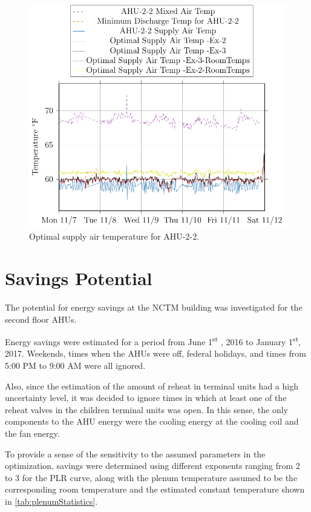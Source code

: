 \begin{figure}
\centering
\includegraphics[]{Plots/2016-11-16-1636-AHU22MixedAirTemp-TikzData.pdf}
\caption{Optimal supply air temperature for AHU-2-2.}
\label{fig:2016-11-16-1636-AHU22MixedAirTemp-TikzData}
\end{figure}

\section{Savings Potential}

The potential for energy savings at the NCTM building was investigated
for the second floor AHUs. 

Energy savings were estimated for a period from June
1\textsuperscript{st} , 2016 to January 1\textsuperscript{st}, 2017.
Weekends, times when the AHUs were off, federal holidays, and times from
5:00 PM to 9:00 AM were all ignored. 

Also, since the estimation of the amount of reheat in terminal
units had a high uncertainty level, it was decided to ignore times in
which at least one of the reheat valves in the children terminal units
was open. In this sense, the only components to the AHU energy were the
cooling energy at the cooling coil and the fan energy. 

To provide a sense of the sensitivity to the assumed parameters in the
optimization, savings were determined using different exponents ranging
from 2 to 3 for the PLR curve, along with the plenum temperature assumed
to be the corresponding room temperature and the estimated constant
temperature shown in \tableref{} \ref{tab:plenumStatistics}. 

